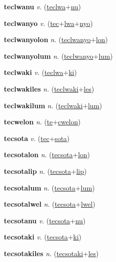 \textbf{\hypertarget{teclwanu}{teclwanu}} \textit{v.} (\hyperlink{teclwa}{teclwa}+\allowbreak \hyperlink{nu}{nu})


\textbf{\hypertarget{teclwanyo}{teclwanyo}} \textit{v.} (\hyperlink{tec}{tec}+\allowbreak \hyperlink{lwa}{lwa}+\allowbreak \hyperlink{nyo}{nyo})


\textbf{\hypertarget{teclwanyolon}{teclwanyolon}} \textit{n.} (\hyperlink{teclwanyo}{teclwanyo}+\allowbreak \hyperlink{lon}{lon})


\textbf{\hypertarget{teclwanyolum}{teclwanyolum}} \textit{n.} (\hyperlink{teclwanyo}{teclwanyo}+\allowbreak \hyperlink{lum}{lum})


\textbf{\hypertarget{teclwaki}{teclwaki}} \textit{v.} (\hyperlink{teclwa}{teclwa}+\allowbreak \hyperlink{ki}{ki})


\textbf{\hypertarget{teclwakiles}{teclwakiles}} \textit{n.} (\hyperlink{teclwaki}{teclwaki}+\allowbreak \hyperlink{les}{les})


\textbf{\hypertarget{teclwakilum}{teclwakilum}} \textit{n.} (\hyperlink{teclwaki}{teclwaki}+\allowbreak \hyperlink{lum}{lum})


\textbf{\hypertarget{tecwelon}{tecwelon}} \textit{n.} (\hyperlink{te}{te}+\allowbreak \hyperlink{cwelon}{cwelon})


\textbf{\hypertarget{tecsota}{tecsota}} \textit{v.} (\hyperlink{tec}{tec}+\allowbreak \hyperlink{sota}{sota})


\textbf{\hypertarget{tecsotalon}{tecsotalon}} \textit{n.} (\hyperlink{tecsota}{tecsota}+\allowbreak \hyperlink{lon}{lon})


\textbf{\hypertarget{tecsotalip}{tecsotalip}} \textit{n.} (\hyperlink{tecsota}{tecsota}+\allowbreak \hyperlink{lip}{lip})


\textbf{\hypertarget{tecsotalum}{tecsotalum}} \textit{n.} (\hyperlink{tecsota}{tecsota}+\allowbreak \hyperlink{lum}{lum})


\textbf{\hypertarget{tecsotalwel}{tecsotalwel}} \textit{n.} (\hyperlink{tecsota}{tecsota}+\allowbreak \hyperlink{lwel}{lwel})


\textbf{\hypertarget{tecsotanu}{tecsotanu}} \textit{v.} (\hyperlink{tecsota}{tecsota}+\allowbreak \hyperlink{nu}{nu})


\textbf{\hypertarget{tecsotaki}{tecsotaki}} \textit{v.} (\hyperlink{tecsota}{tecsota}+\allowbreak \hyperlink{ki}{ki})


\textbf{\hypertarget{tecsotakiles}{tecsotakiles}} \textit{n.} (\hyperlink{tecsotaki}{tecsotaki}+\allowbreak \hyperlink{les}{les})


